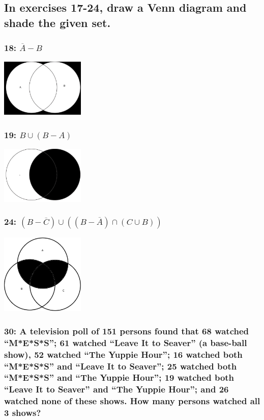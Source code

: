 \documentclass[12pt,titlepage]{article}
\begin{document}
\subsection*{In exercises 17-24, draw a Venn diagram and shade the given set.}
\subsubsection*{18: $\overline{A} - B$}

\includegraphics[width=40mm]{notAcomplimentB.jpg}
\subsubsection*{19: $B \cup (B - A)$}

\includegraphics[width=40mm]{number23.jpg}
\subsubsection*{24: $(B - \overline{C}) \cup ((B - \overline{A}) \cap (C \cup B))$}

\includegraphics[width=40mm]{number24.jpg}
\subsubsection*{30: A television poll of 151 persons found that 68 watched ``M*E*S*S''; 61 watched ``Leave It to Seaver'' (a base-ball
show), 52 watched ``The Yuppie Hour''; 16 watched both ``M*E*S*S'' and ``Leave It to Seaver''; 25 watched both ``M*E*S*S'' and 
``The Yuppie Hour''; 19 watched both ``Leave It to Seaver'' and ``The Yuppie Hour''; and 26 watched none of these shows. How many 
persons watched all 3 shows?}
\end{document}
